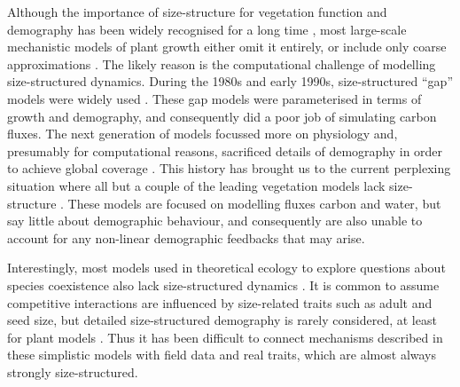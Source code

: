\documentclass[]{article}
\begin{document}
Although the importance of size-structure for vegetation function and
demography has been widely recognised for a long time
\citep{Harper-1977, Hara-1984, Shugart-1980, Huston-1987, Moorcroft-2001, Kohyama-1993, Enquist-1999, Pacala-1996, Coomes-2007},
most large-scale mechanistic models of plant growth either omit it
entirely, or include only coarse approximations
\citep{Cramer-2001, Sitch-2003}. The likely reason is the computational
challenge of modelling size-structured dynamics. During the 1980s and
early 1990s, size-structured ``gap'' models were widely used
\citep[e.g.][]{Huston-1987, Shugart-1980}. These gap models were
parameterised in terms of growth and demography, and consequently did a
poor job of simulating carbon fluxes. The next generation of models
focussed more on physiology and, presumably for computational reasons,
sacrificed details of demography in order to achieve global coverage
\citep[eg.][]{Haxeltine-1996}. This history has brought us to the
current perplexing situation where all but a couple
\citep[e.g.][]{Moorcroft-2001, Smith-2014} of the leading vegetation
models lack size-structure
\citep{Cramer-2001, Dekauwe-2014, Sitch-2003, Kelley-2013}. These models
are focused on modelling fluxes carbon and water, but say little about
demographic behaviour, and consequently are also unable to account for
any non-linear demographic feedbacks that may arise.

Interestingly, most models used in theoretical ecology to explore
questions about species coexistence also lack size-structured dynamics
\citep[e.g.][]{MacArthur-1967, Levin-1974, Leimar-2013, Geritz-1995, Calcagno-2006, Tilman-1985}.
It is common to assume competitive interactions are influenced by
size-related traits such as adult and seed size, but detailed
size-structured demography is rarely considered, at least for plant
models \citetext{\citealp[for animal
examples,][]{Deroos-1988}; \citealp[see][]{Deroos-1992}}. Thus it has
been difficult to connect mechanisms described in these simplistic
models with field data and real traits, which are almost always strongly
size-structured.
\end{document}
